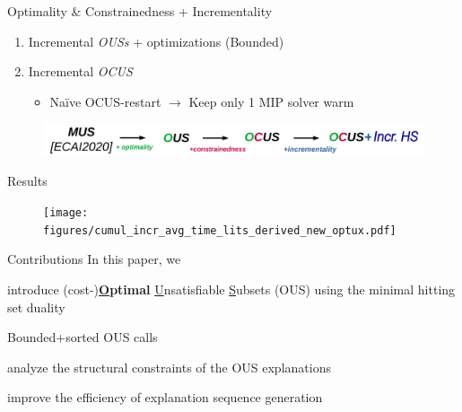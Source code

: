 \documentclass[handout]{beamer}
\begin{document}
\begin{frame}{Optimality \& Constrainedness + Incrementality}
		\begin{enumerate}
			\item \color{vuborange} Incremental \emph{OUSs} + optimizations {\color{blue} (Bounded)}\pause
			\item {\color{vuborange} Incremental \emph{OCUS}}
			\begin{itemize}
				\item Naïve OCUS-restart $\rightarrow$ Keep only 1 MIP solver warm
			\end{itemize}
		\end{enumerate}
		\begin{figure}
			\includegraphics[width=\textwidth]{mus_to_ocus_i.png}
		\end{figure}
	\end{frame}


\begin{frame}{Results}
	\begin{figure}
		\texttt{[image: figures/cumul\_incr\_avg\_time\_lits\_derived\_new\_optux.pdf]}
	\end{figure}
\end{frame}
	
	\begin{frame}{Contributions}
		In this paper, we
			\begin{description}[font=\color{vuborange}\itshape]
			\item[\hspace{0.9cm}Optimality] introduce (cost-)\textbf{\underline{O}ptimal} \underline{U}nsatisfiable \underline{S}ubsets (OUS) using the minimal hitting set duality 
			\item[\hspace{1.05cm}Efficiency] Bounded+sorted OUS calls
			\item[Constrainedness]  analyze the structural constraints of the OUS explanations
			\item[\hspace{0.3cm}Incrementality] improve the efficiency of explanation sequence generation
		\end{description}
		\vfill
	\end{frame}
	
\end{document}
